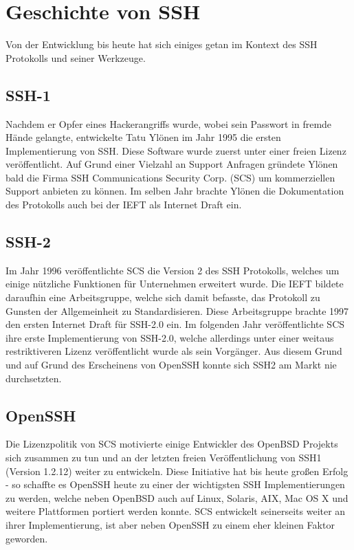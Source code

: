 \documentclass[fleqn,10pt]{SelfArx} %
\begin{document}
\section{Geschichte von SSH}
Von der Entwicklung bis heute hat sich einiges getan im Kontext des SSH Protokolls und seiner Werkzeuge.
\subsection{SSH-1}
Nachdem er Opfer eines Hackerangriffs wurde, wobei sein Passwort in fremde Hände gelangte, entwickelte Tatu Ylönen im Jahr 1995 die ersten Implementierung von SSH. Diese Software wurde zuerst unter einer freien Lizenz veröffentlicht. Auf Grund einer Vielzahl an Support Anfragen gründete Ylönen bald die Firma SSH Communications Security Corp. (SCS) um kommerziellen Support anbieten zu können.
Im selben Jahr brachte Ylönen die Dokumentation des Protokolls auch bei der IEFT als Internet Draft ein.
\subsection{SSH-2}
Im Jahr 1996 veröffentlichte SCS die Version 2 des SSH Protokolls, welches um einige nützliche Funktionen für Unternehmen erweitert wurde. Die IEFT bildete daraufhin eine Arbeitsgruppe, welche sich damit befasste, das Protokoll zu Gunsten der Allgemeinheit zu Standardisieren. Diese Arbeitsgruppe brachte 1997 den ersten Internet Draft für SSH-2.0 ein. Im folgenden Jahr veröffentlichte SCS ihre erste Implementierung von SSH-2.0, welche allerdings unter einer weitaus restriktiveren Lizenz veröffentlicht wurde als sein Vorgänger. Aus diesem Grund und auf Grund des Erscheinens von OpenSSH konnte sich SSH2 am Markt nie durchsetzten.            \subsection{OpenSSH}
Die Lizenzpolitik von SCS motivierte einige Entwickler des OpenBSD Projekts sich zusammen zu tun und an der letzten freien Veröffentlichung von SSH1 (Version 1.2.12) weiter zu entwickeln. Diese Initiative hat bis heute großen Erfolg - so schaffte es OpenSSH heute zu einer der wichtigsten SSH Implementierungen zu werden, welche neben OpenBSD auch auf Linux, Solaris, AIX, Mac OS X und weitere Plattformen portiert werden konnte. SCS entwickelt seinerseits weiter an ihrer Implementierung, ist aber neben OpenSSH zu einem eher kleinen Faktor geworden.
\end{document}
